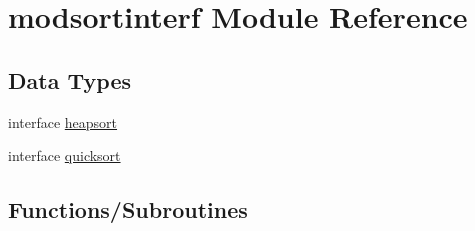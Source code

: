 \hypertarget{namespacemodsortinterf}{}\section{modsortinterf Module Reference}
\label{namespacemodsortinterf}
\subsection*{Data Types}
\begin{DoxyCompactItemize}
\item 
interface \hyperlink{interfacemodsortinterf_1_1heapsort}{heapsort}
\item 
interface \hyperlink{interfacemodsortinterf_1_1quicksort}{quicksort}
\end{DoxyCompactItemize}
\subsection*{Functions/\+Subroutines}
